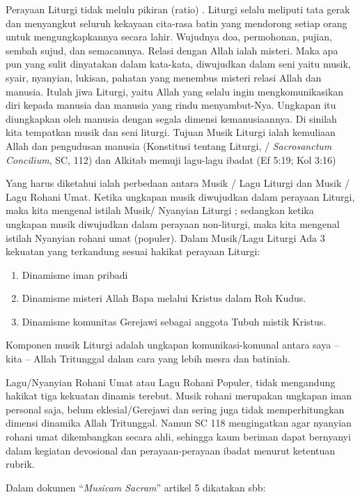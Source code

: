 Perayaan Liturgi  tidak melulu  pikiran (ratio) . Liturgi selalu meliputi tata gerak dan menyangkut  seluruh kekayaan cita-rasa batin yang mendorong setiap orang untuk mengungkapkannya secara lahir. Wujudnya doa, permohonan, pujian, sembah sujud, dan semacamnya. Relasi dengan Allah ialah misteri. Maka apa pun yang sulit dinyatakan dalam kata-kata, diwujudkan dalam seni yaitu musik, syair, nyanyian, lukisan, pahatan yang menembus misteri relasi Allah dan manusia. Itulah jiwa Liturgi, yaitu Allah yang selalu ingin mengkomunikasikan diri kepada manusia dan manusia yang rindu menyambut-Nya. Ungkapan itu diungkapkan oleh manusia dengan segala dimensi kemanusiaannya. Di sinilah kita tempatkan musik dan seni liturgi. Tujuan Musik Liturgi ialah kemuliaan Allah dan pengudusan manusia (Konstitusi tentang Liturgi, / \textit{Sacrosanctum Concilium}, SC, 112) dan Alkitab memuji lagu-lagu ibadat (Ef 5:19; Kol 3:16)

Yang harus diketahui ialah perbedaan antara Musik / Lagu Liturgi dan Musik / Lagu Rohani Umat.   Ketika ungkapan musik diwujudkan dalam perayaan Liturgi, maka kita mengenal istilah Musik/ Nyanyian Liturgi ; sedangkan ketika ungkapan musik diwujudkan dalam perayaan non-liturgi, maka kita mengenal istilah Nyanyian rohani umat (populer). Dalam Musik/Lagu Liturgi Ada 3 kekuatan yang terkandung sesuai hakikat perayaan Liturgi:
\begin{enumerate}
\item Dinamisme iman pribadi

\item Dinamisme misteri Allah Bapa melalui Kristus dalam Roh Kudus.

\item Dinamisme komunitas Gerejawi sebagai anggota Tubuh mistik Kristus.
\end{enumerate}

Komponen musik Liturgi adalah ungkapan komunikasi-komunal antara  saya – kita – Allah Tritunggal dalam cara yang lebih mesra dan batiniah.

Lagu/Nyanyian Rohani Umat atau Lagu Rohani Populer, tidak mengandung hakikat  tiga kekuatan dinamis terebut. Musik rohani merupakan ungkapan iman personal saja, belum eklesial/Gerejawi dan sering juga tidak memperhitungkan dimensi dinamika Allah Tritunggal. Namun SC 118 mengingatkan agar nyanyian rohani umat dikembangkan secara ahli, sehingga kaum beriman dapat bernyanyi dalam kegiatan devosional dan perayaan-perayaan ibadat menurut ketentuan rubrik.

Dalam dokumen “\textit{Musicam Sacram}” artikel 5 dikatakan sbb:

